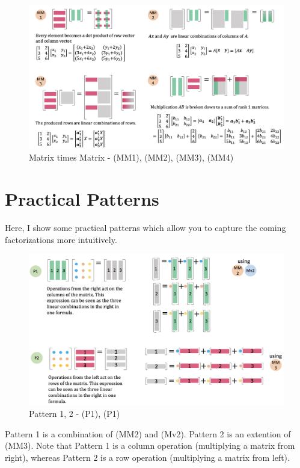 \documentclass[letterpaper]{article}
\begin{document}
\begin{figure}[H]
  \includegraphics[keepaspectratio, width=\linewidth]{MatrixTimesMatrix.png}
  \caption{Matrix times Matrix - (MM1), (MM2), (MM3), (MM4)}
\end{figure}

\clearpage


\section{Practical Patterns}

Here, I show some practical patterns which allow you to capture
the coming factorizations more intuitively.

\begin{figure}[H]
  \includegraphics[keepaspectratio, width=\linewidth]{Pattern12.png}
  \caption{Pattern 1, 2 - (P1), (P1)}
\end{figure}

Pattern 1 is a combination of (MM2) and (Mv2).
Pattern 2 is an extention of (MM3). Note that Pattern 1 is a column operation (multiplying a matrix from right),
whereas Pattern 2 is a row operation (multiplying a matrix from left).
\end{document}
